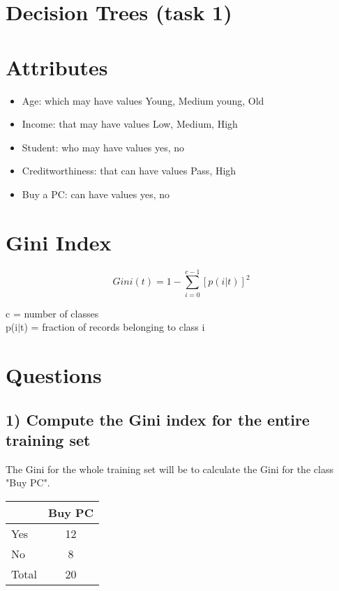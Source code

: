 \section{Decision Trees (task 1)}

\section*{Attributes}
	\begin{itemize}
		\item Age: which may have values {Young, Medium young, Old}
		\item Income: that may have values {Low, Medium, High}
		\item Student: who may have values {yes, no}
		\item Creditworthiness: that can have values {Pass, High}
		\item Buy a PC: can have values {yes, no}
	\end{itemize}

\section*{Gini Index}

	
		\begin{equation}
		Gini(t) = 1 - \sum_{i=0}^{c-1} [p(i|t)]^{2} 
		\end{equation}
	
		c = number of classes \\
		p(i$|$t) = fraction of records belonging to class i


\section*{Questions} 
	
		\subsection*{1) Compute the Gini index for the entire training set}

		The Gini for the whole training set will be to calculate the Gini for the 
		class "Buy PC".

		\begin{table}[H]
			\begin{tabular}{ l | c }
				 & Buy PC \\ \hline
				Yes & 12 \\ \hline
				No & 8 \\ \hline
				Total & 20 \\
			\end{tabular}
		\end{table}

